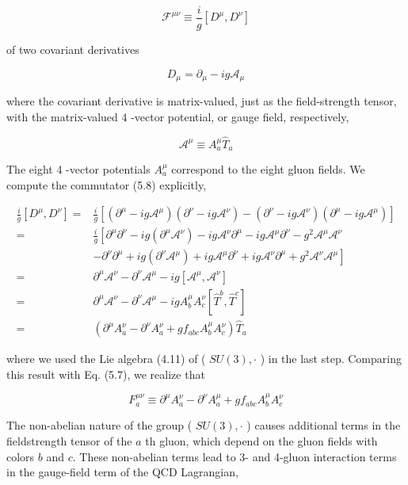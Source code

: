 \documentclass[10pt, letterpaper]{article}
\begin{document}
$$
\mathcal{F}^{\mu \nu} \equiv \frac{i}{g}\left[D^{\mu}, D^{\nu}\right]
$$

of two covariant derivatives

$$
D_{\mu}=\partial_{\mu}-i g \mathcal{A}_{\mu}
$$

where the covariant derivative is matrix-valued, just as the field-strength tensor, with the matrix-valued 4 -vector potential, or gauge field, respectively,

$$
\mathcal{A}^{\mu} \equiv A_{a}^{\mu} \hat{T}_{a}
$$

The eight 4 -vector potentials $A_{a}^{\mu}$ correspond to the eight gluon fields. We compute the commutator (5.8) explicitly,

$$
\begin{aligned}
\frac{i}{g}\left[D^{\mu}, D^{\nu}\right]= & \frac{i}{g}\left[\left(\partial^{\mu}-i g \mathcal{A}^{\mu}\right)\left(\partial^{\nu}-i g \mathcal{A}^{\nu}\right)-\left(\partial^{\nu}-i g \mathcal{A}^{\nu}\right)\left(\partial^{\mu}-i g \mathcal{A}^{\mu}\right)\right] \\
= & \frac{i}{g}\left[\partial^{\mu} \partial^{\nu}-i g\left(\partial^{\mu} \mathcal{A}^{\nu}\right)-i g \mathcal{A}^{\nu} \partial^{\mu}-i g \mathcal{A}^{\mu} \partial^{\nu}-g^{2} \mathcal{A}^{\mu} \mathcal{A}^{\nu}\right. \\
& \left.-\partial^{\nu} \partial^{\mu}+i g\left(\partial^{\nu} \mathcal{A}^{\mu}\right)+i g \mathcal{A}^{\mu} \partial^{\nu}+i g \mathcal{A}^{\nu} \partial^{\mu}+g^{2} \mathcal{A}^{\nu} \mathcal{A}^{\mu}\right] \\
= & \partial^{\mu} \mathcal{A}^{\nu}-\partial^{\nu} \mathcal{A}^{\mu}-i g\left[\mathcal{A}^{\mu}, \mathcal{A}^{\nu}\right] \\
= & \partial^{\mu} \mathcal{A}^{\nu}-\partial^{\nu} \mathcal{A}^{\mu}-i g A_{b}^{\mu} A_{c}^{\nu}\left[\hat{T}^{b}, \hat{T}^{c}\right] \\
= & \left(\partial^{\mu} A_{a}^{\nu}-\partial^{\nu} A_{a}^{\nu}+g f_{a b c} A_{b}^{\mu} A_{c}^{\nu}\right) \hat{T}_{a}
\end{aligned}
$$

where we used the Lie algebra (4.11) of ( $S U(3), \cdot$ ) in the last step. Comparing this result with Eq. (5.7), we realize that

$$
F_{a}^{\mu \nu} \equiv \partial^{\mu} A_{a}^{\nu}-\partial^{\nu} A_{a}^{\mu}+g f_{a b c} A_{b}^{\mu} A_{c}^{\nu}
$$

The non-abelian nature of the group ( $S U(3), \cdot$ ) causes additional terms in the fieldstrength tensor of the $a$ th gluon, which depend on the gluon fields with colors $b$ and $c$. These non-abelian terms lead to 3- and 4-gluon interaction terms in the gauge-field term of the QCD Lagrangian,
\end{document}
